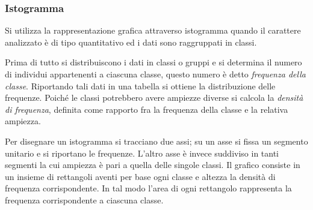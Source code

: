 \subsubsection{Istogramma}
Si utilizza la rappresentazione grafica attraverso istogramma quando il 
carattere analizzato è di tipo quantitativo ed i dati sono raggruppati in 
classi.

Prima di tutto si distribuiscono i dati in classi o gruppi e si determina 
il numero di individui appartenenti a ciascuna classe, questo numero è
detto \emph{frequenza della classe}.
Riportando tali dati in una tabella si ottiene la distribuzione delle 
frequenze. Poiché le classi potrebbero avere ampiezze diverse si calcola
la \emph{densità di frequenza}, definita come rapporto fra la frequenza 
della classe e la relativa ampiezza.

Per disegnare un istogramma si tracciano due assi; su un asse si fissa un 
segmento unitario e si riportano le frequenze. 
L'altro asse è invece suddiviso in tanti segmenti la cui ampiezza è pari a 
quella delle singole classi.
Il grafico consiste in un insieme di rettangoli aventi per base ogni classe 
e altezza la densità di frequenza corrispondente.
In tal modo l'area di ogni rettangolo rappresenta la frequenza 
corrispondente a ciascuna classe.

